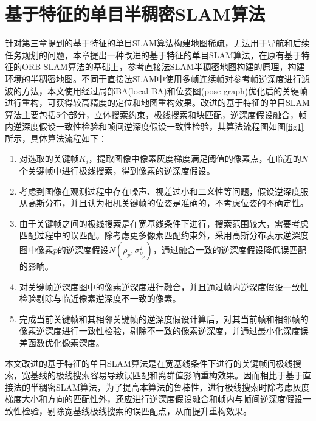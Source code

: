 
\chapter{基于特征的单目半稠密SLAM算法}
\label{chap:Semi-Dense}

针对第三章提到的基于特征的单目SLAM算法构建地图稀疏，无法用于导航和后续任务规划的问题，本章提出一种改进的基于特征的单目SLAM算法，在原有基于特征的ORB-SLAM算法的基础上，参考直接法SLAM半稠密地图构建的原理，构建环境的半稠密地图。不同于直接法SLAM中使用多帧连续帧对参考帧逆深度进行滤波的方法，本文使用经过局部BA(local BA)和位姿图(pose graph)优化后的关键帧进行重构，可获得较高精度的定位和地图重构效果。改进的基于特征的单目SLAM算法主要包括5个部分，立体搜索约束，极线搜索和块匹配，逆深度假设融合，帧内逆深度假设一致性检验和帧间逆深度假设一致性检验，其算法流程图如图\ref{fig1}所示，具体算法流程如下：
\begin{enumerate}[label={(\arabic*)}]

\item 对选取的关键帧$K_i$，提取图像中像素灰度梯度满足阈值的像素点，在临近的$N$个关键帧中进行极线搜索，得到像素的逆深度假设。

\item 考虑到图像在观测过程中存在噪声、视差过小和二义性等问题，假设逆深度服从高斯分布，并且认为相机关键帧的位姿是准确的，不考虑位姿的不确定性。

\item 由于关键帧之间的极线搜索是在宽基线条件下进行，搜索范围较大，需要考虑匹配过程中的误匹配。除考虑更多像素匹配约束外，采用高斯分布表示逆深度图中像素$p$的逆深度假设$N(\rho_p, \sigma_{\rho_p}^2)$，通过融合一致的逆深度假设降低误匹配的影响。

\item 对关键帧逆深度图中的像素逆深度进行融合，并且通过帧内逆深度假设一致性检验剔除与临近像素逆深度不一致的像素。

\item 完成当前关键帧和其相邻关键帧的逆深度假设计算后，对其当前帧和相邻帧的像素逆深度进行一致性检验，剔除不一致的像素逆深度，并通过最小化深度误差函数优化像素深度。

\end{enumerate}

本文改进的基于特征的单目SLAM算法是在宽基线条件下进行的关键帧间极线搜索，宽基线的极线搜索容易导致误匹配和离群值影响重构效果。因而相比于基于直接法的半稠密SLAM算法，为了提高本算法的鲁棒性，进行极线搜索时除考虑灰度梯度大小和方向的匹配性外，还应进行逆深度假设融合和帧内与帧间逆深度假设一致性检验，剔除宽基线极线搜索的误匹配点，从而提升重构效果。

